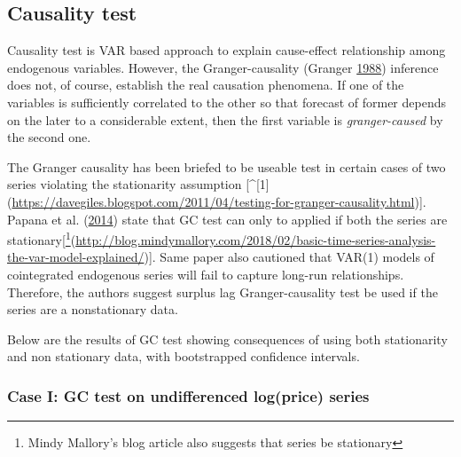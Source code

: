 \documentclass[
  12pt,
]{article}
\begin{document}
\hypertarget{causality-test}{%
\subsection{Causality test}\label{causality-test}}

Causality test is VAR based approach to explain cause-effect relationship among endogenous variables. However, the Granger-causality (Granger \protect\hyperlink{ref-granger1988causality}{1988}) inference does not, of course, establish the real causation phenomena. If one of the variables is sufficiently correlated to the other so that forecast of former depends on the later to a considerable extent, then the first variable is \emph{granger-caused} by the second one.

The Granger causality has been briefed to be useable test in certain cases of two series violating the stationarity assumption {[}\^{}{[}1{]}(\url{https://davegiles.blogspot.com/2011/04/testing-for-granger-causality.html}){]}. Papana et al. (\protect\hyperlink{ref-papana2014identifying}{2014}) state that GC test can only to applied if both the series are stationary{[}\footnote{Mindy Mallory's blog article also suggests that series be stationary}(\url{http://blog.mindymallory.com/2018/02/basic-time-series-analysis-the-var-model-explained/}){]}. Same paper also cautioned that VAR(1) models of cointegrated endogenous series will fail to capture long-run relationships. Therefore, the authors suggest surplus lag Granger-causality test be used if the series are a nonstationary data.

Below are the results of GC test showing consequences of using both stationarity and non stationary data, with bootstrapped confidence intervals.

\hypertarget{case-i-gc-test-on-undifferenced-logprice-series}{%
\subsubsection{Case I: GC test on undifferenced log(price) series}\label{case-i-gc-test-on-undifferenced-logprice-series}}
\end{document}
